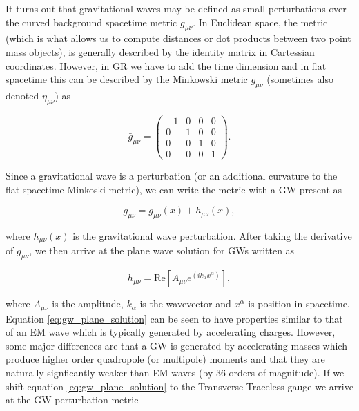 %
%
It turns out that gravitational waves may be defined as small perturbations over the curved background spacetime metric $g_{\mu \nu}$. In Euclidean space, the metric (which is what allows us to compute distances or dot products between two point mass objects), is generally described by the identity matrix in Cartessian coordinates. However, in \ac{GR} we have to add the time dimension and in flat spacetime this can be described by the Minkowski metric $\bar{g}_{\mu \nu}$ (sometimes also denoted $\eta_{\mu \nu}$) as

\begin{equation}
  \bar{g}_{\mu \nu} =   \begin{pmatrix}
-1 & 0 & 0 & 0\\
0 & 1 & 0 & 0\\
0 & 0 & 1 & 0\\
0 & 0 & 0 & 1
\end{pmatrix}.
\end{equation}

Since a gravitational wave is a perturbation (or an additional curvature to the flat spacetime Minkoski metric), we can write the metric with a \ac{GW} present as  

\begin{equation}
    g_{\mu \nu} = \bar{g}_{\mu \nu}(x) + h_{\mu \nu}(x),
\end{equation}{}

where $h_{\mu \nu}(x)$ is the gravitational wave perturbation. After taking the derivative of $g_{\mu\nu}$, we then arrive at the plane wave solution for \ac{GW}s written as

\begin{equation}\label{eq:gw_plane_solution}
    h_{\mu\nu} = \textrm{Re}[A_{\mu\nu} e^{(ik_{\alpha}x^{\alpha})}],
\end{equation}{}

where $A_{\mu\nu}$ is the amplitude, $k_{\alpha}$ is the wavevector and $x^{\alpha}$ is position in spacetime. Equation \ref{eq:gw_plane_solution} can be seen to have properties similar to that of an \ac{EM} wave which is typically generated by accelerating charges. However, some major differences are that a \ac{GW} is generated by accelerating masses which produce higher order quadropole (or multipole) moments and that they are naturally signficantly weaker than \ac{EM} waves (by 36 orders of magnitude). If we shift equation \ref{eq:gw_plane_solution} to the Transverse Traceless gauge we arrive at the \ac{GW} perturbation metric

